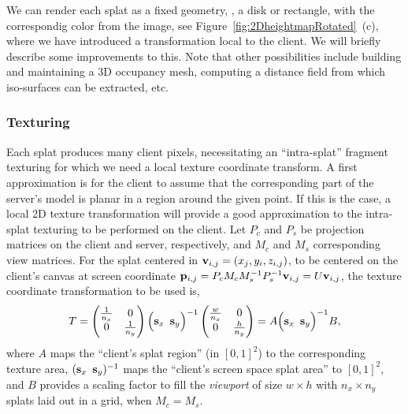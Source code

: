 We can render each splat as a fixed geometry, \eg, a disk or rectangle, with the
correspondig color from the image, see Figure~\ref{fig:2DheightmapRotated}~(c),
where we have introduced a transformation local to the client.  We will briefly
describe some improvements to this. Note that other possibilities include
building and maintaining a 3D occupancy mesh, computing a distance field from
which iso-surfaces can be extracted, etc.

\subsubsection{Texturing}

Each splat produces many client pixels, necessitating an ``intra-splat''
fragment texturing for which we need a local texture coordinate transform.
A first approximation is for the client to assume that the corresponding part of
the server's model is planar in a region around the given point. If this is the
case, a local 2D texture transformation will provide a good approximation to the
intra-splat texturing to be performed on the client. Let $P_c$ and $P_s$ be
projection matrices on the client and server, respectively, and $M_c$ and $M_s$
corresponding view matrices. For the splat centered in $\mathbf{v}_{i, j} = (x_j, y_i,
z_{i, j})$, to be centered on the client's canvas at screen coordinate $\mathbf{p}_{i,
j} = P_c M_c M_s^{-1} P_s^{-1}\mathbf{v}_{i, j} = U\mathbf{v}_{i, j}$, the texture coordinate
transformation to be used is,
\[
  T =
  \begin{pmatrix}
    \frac{1}{n_x} & 0 \\
    0 & \frac{1}{n_y}
  \end{pmatrix}
  \Big( \mathbf{s}_x \, \, \, \mathbf{s}_y \Big)^{-1}
  \begin{pmatrix} 
    \frac{w}{n_x} & 0 \\
     0 & \frac{h}{n_y}
  \end{pmatrix}
   =
  A
  \Big( \mathbf{s}_x \, \, \, \mathbf{s}_y \Big)^{-1}
  B,
\]
where $A$ maps the ``client's splat region'' (in $[0, 1]^2$) to the
corresponding texture area, $(\mathbf{s}_{x} \, \, \, \mathbf{s}_{y})^{-1}$ maps the
``client's screen space splat area'' to $[0, 1]^2$, and $B$ provides a scaling
factor to fill the {\em viewport} of size $w \times h$ with $n_x \times n_y$
splats laid out in a grid, when $M_c=M_s$.
%
